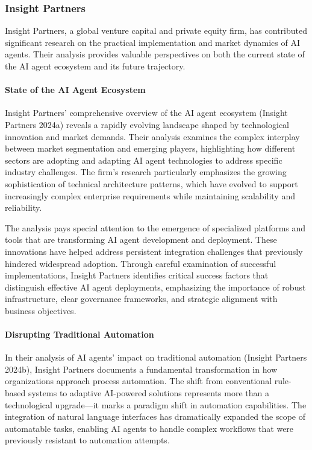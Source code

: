 \documentclass[
]{article}
\begin{document}
\subsubsection{Insight Partners}\label{insight-partners}

Insight Partners, a global venture capital and private equity firm, has
contributed significant research on the practical implementation and
market dynamics of AI agents. Their analysis provides valuable
perspectives on both the current state of the AI agent ecosystem and its
future trajectory.

\paragraph{State of the AI Agent
Ecosystem}\label{state-of-the-ai-agent-ecosystem}

Insight Partners' comprehensive overview of the AI agent ecosystem
(Insight Partners 2024a) reveals a rapidly evolving landscape shaped by
technological innovation and market demands. Their analysis examines the
complex interplay between market segmentation and emerging players,
highlighting how different sectors are adopting and adapting AI agent
technologies to address specific industry challenges. The firm's
research particularly emphasizes the growing sophistication of technical
architecture patterns, which have evolved to support increasingly
complex enterprise requirements while maintaining scalability and
reliability.

The analysis pays special attention to the emergence of specialized
platforms and tools that are transforming AI agent development and
deployment. These innovations have helped address persistent integration
challenges that previously hindered widespread adoption. Through careful
examination of successful implementations, Insight Partners identifies
critical success factors that distinguish effective AI agent
deployments, emphasizing the importance of robust infrastructure, clear
governance frameworks, and strategic alignment with business objectives.

\paragraph{Disrupting Traditional
Automation}\label{disrupting-traditional-automation}

In their analysis of AI agents' impact on traditional automation
(Insight Partners 2024b), Insight Partners documents a fundamental
transformation in how organizations approach process automation. The
shift from conventional rule-based systems to adaptive AI-powered
solutions represents more than a technological upgrade---it marks a
paradigm shift in automation capabilities. The integration of natural
language interfaces has dramatically expanded the scope of automatable
tasks, enabling AI agents to handle complex workflows that were
previously resistant to automation attempts.
\end{document}
